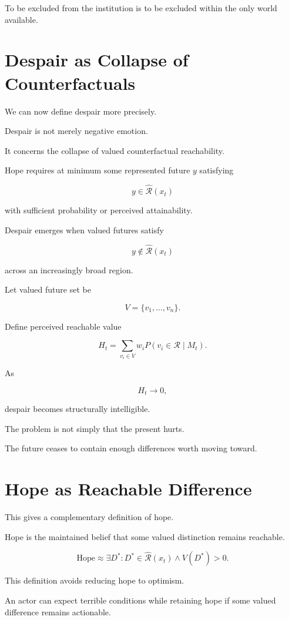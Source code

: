 \documentclass[11pt,oneside]{book}
\theoremstyle{definition}
\theoremstyle{remark}
\newcommand{\R}{\mathcal{R}}
\begin{document}
To be excluded from the institution is to be excluded within the only world available.

\section{Despair as Collapse of Counterfactuals}

We can now define despair more precisely.

Despair is not merely negative emotion.

It concerns the collapse of valued counterfactual reachability.

Hope requires at minimum some represented future \(y\) satisfying

\[
y\in\widehat{\R}(x_t)
\]

with sufficient probability or perceived attainability.

Despair emerges when valued futures satisfy

\[
y\notin\widehat{\R}(x_t)
\]

across an increasingly broad region.

Let valued future set be

\[
V=\{v_1,\ldots,v_n\}.
\]

Define perceived reachable value

\[
H_t
=
\sum_{v_i\in V}
w_i
P(v_i\in\R\mid M_t).
\]

As

\[
H_t\rightarrow0,
\]

despair becomes structurally intelligible.

The problem is not simply that the present hurts.

The future ceases to contain enough differences worth moving toward.

\section{Hope as Reachable Difference}

This gives a complementary definition of hope.

Hope is the maintained belief that some valued distinction remains reachable.

\[
\boxed{
\text{Hope}
\approx
\exists D^\ast:
D^\ast\in\widehat{\R}(x_t)
\land
V(D^\ast)>0.
}
\]

This definition avoids reducing hope to optimism.

An actor can expect terrible conditions while retaining hope if some valued difference remains actionable.
\end{document}
